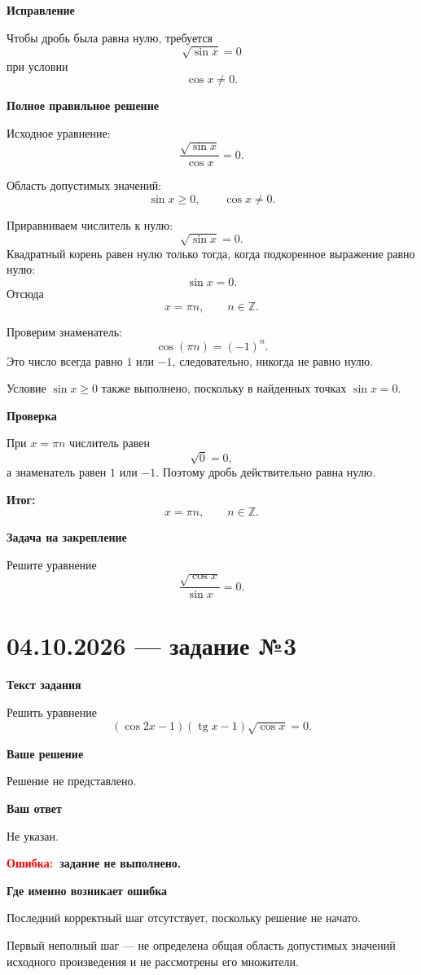 \documentclass[12pt,a4paper]{article}
\newcommand{\err}{\textcolor{red}{Ошибка:}}
\newcommand{\result}{\textcolor{teal!60!black}{Итог:}}
\begin{document}
\textbf{Исправление}

Чтобы дробь была равна нулю, требуется
\[
\sqrt{\sin x}=0
\]
при условии
\[
\cos x\ne 0.
\]

\textbf{Полное правильное решение}

Исходное уравнение:
\[
\frac{\sqrt{\sin x}}{\cos x}=0.
\]

Область допустимых значений:
\[
\sin x\ge 0,\qquad \cos x\ne 0.
\]

Приравниваем числитель к нулю:
\[
\sqrt{\sin x}=0.
\]
Квадратный корень равен нулю только тогда, когда подкоренное выражение равно нулю:
\[
\sin x=0.
\]
Отсюда
\[
x=\pi n,\qquad n\in\mathbb Z.
\]

Проверим знаменатель:
\[
\cos(\pi n)=(-1)^n.
\]
Это число всегда равно \(1\) или \(-1\), следовательно, никогда не равно нулю.

Условие \(\sin x\ge 0\) также выполнено, поскольку в найденных точках \(\sin x=0\).

\textbf{Проверка}

При \(x=\pi n\) числитель равен
\[
\sqrt{0}=0,
\]
а знаменатель равен \(1\) или \(-1\). Поэтому дробь действительно равна нулю.

\textbf{\result}
\[
\boxed{x=\pi n,\qquad n\in\mathbb Z.}
\]

\textbf{Задача на закрепление}

Решите уравнение
\[
\frac{\sqrt{\cos x}}{\sin x}=0.
\]

\newpage
{}\label{task:0410-3}
\section*{04.10.2026 — задание №3}

\textbf{Текст задания}

Решить уравнение
\[
(\cos 2x-1)(\operatorname{tg}x-1)\sqrt{\cos x}=0.
\]

\textbf{Ваше решение}

Решение не представлено.

\textbf{Ваш ответ}

Не указан.

\textbf{\err\ задание не выполнено.}

\textbf{Где именно возникает ошибка}

Последний корректный шаг отсутствует, поскольку решение не начато.

Первый неполный шаг --- не определена общая область допустимых значений исходного произведения и не рассмотрены его множители.
\end{document}
